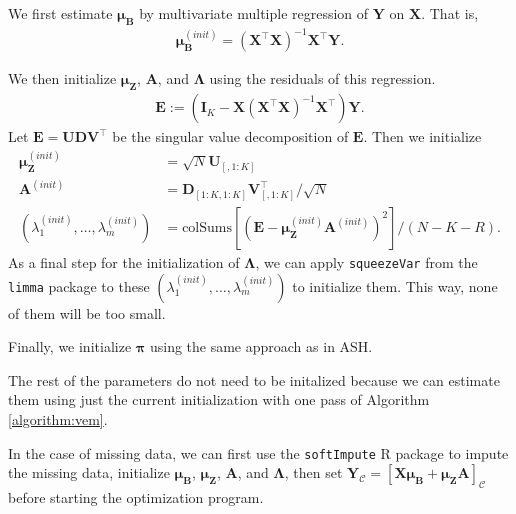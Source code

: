 \documentclass[11pt,authoryear]{article}
\newcommand{\bs}[1]{\boldsymbol{#1}}
\begin{document}
We first estimate $\bs{\mu}_{\bs{B}}$ by multivariate multiple regression of $\bs{Y}$ on $\bs{X}$. That is,
\begin{align}
\bs{\mu}_{\bs{B}}^{(init)} = (\bs{X}^{\intercal}\bs{X})^{-1}\bs{X}^{\intercal}\bs{Y}.
\end{align}

We then initialize $\bs{\mu}_{\bs{Z}}$, $\bs{A}$, and $\bs{\Lambda}$ using the residuals of this regression.
\begin{align}
\bs{E} := (\bs{I}_{K} - \bs{X}(\bs{X}^{\intercal}\bs{X})^{-1}\bs{X}^{\intercal})\bs{Y}.
\end{align}
Let $\bs{E} = \bs{U}\bs{D}\bs{V}^{\intercal}$ be the singular value decomposition of $\bs{E}$. Then we initialize
\begin{align}
\bs{\mu}_{\bs{Z}}^{(init)} &= \sqrt{N}\bs{U}_{[, 1:K]}\\
\bs{A}^{(init)} &= \bs{D}_{[1:K, 1:K]}\bs{V}_{[, 1:K]}^{\intercal}/\sqrt{N}\\
(\lambda_1^{(init)},\ldots,\lambda_m^{(init)}) &= \text{colSums}\left[(\bs{E} - \bs{\mu}_{\bs{Z}}^{(init)}\bs{A}^{(init)})^2\right] / (N - K - R).
\end{align}
As a final step for the initialization of $\bs{\Lambda}$, we can apply
\texttt{squeezeVar} from the \texttt{limma} package to these
$(\lambda_1^{(init)},\ldots,\lambda_m^{(init)})$ to initialize
them. This way, none of them will be too small.

Finally, we initialize $\bs{\pi}$ using the same approach as in ASH.

The rest of the parameters do not need to be initalized because we can
estimate them using just the current initialization with one pass of
Algorithm \ref{algorithm:vem}.

In the case of missing data, we can first use the \texttt{softImpute}
R package to impute the missing data, initialize $\bs{\mu}_{\bs{B}}$,
$\bs{\mu}_{\bs{Z}}$, $\bs{A}$, and $\bs{\Lambda}$, then set
$\bs{Y}_{\mathcal{C}} = \left[\bs{X}\bs{\mu}_{\bs{B}} +
  \bs{\mu}_{\bs{Z}}\bs{A}\right]_{\mathcal{C}}$ before starting the
optimization program.
\end{document}
